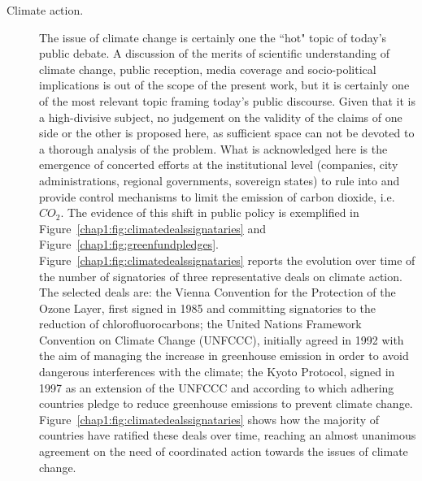 \begin{description}
\item[Climate action.] The issue of climate change is certainly one the ``hot" topic of today's public debate. A discussion of the merits of scientific understanding of climate change, public reception, media coverage and socio-political implications is out of the scope of the present work, but it is certainly one of the most relevant topic framing today's public discourse. Given that it is a high-divisive subject, no judgement on the validity of the claims of one side or the other is proposed here, as sufficient space can not be devoted to a thorough analysis of the problem. What is acknowledged here is the emergence of concerted efforts at the institutional level (companies, city administrations, regional governments, sovereign states) to rule into and provide control mechanisms to limit the emission of carbon dioxide, i.e. $CO_{2}$. The evidence of this shift in public policy is exemplified in Figure~\ref{chap1:fig:climatedealssignataries} and Figure~\ref{chap1:fig:greenfundpledges}.\\ Figure~\ref{chap1:fig:climatedealssignataries} reports the evolution over time of the number of signatories of three representative deals on climate action. The selected deals are: the Vienna Convention for the Protection of the Ozone Layer, first signed in 1985 and committing signatories to the reduction of chlorofluorocarbons; the United Nations Framework Convention on Climate Change (UNFCCC), initially agreed in 1992 with the aim of managing the increase in greenhouse emission in order to avoid dangerous interferences with the climate; the Kyoto Protocol, signed in 1997 as an extension of the UNFCCC and according to which adhering countries pledge to reduce greenhouse emissions to prevent climate change. Figure~\ref{chap1:fig:climatedealssignataries} shows how the majority of countries have ratified these deals over time, reaching an almost unanimous agreement on the need of coordinated action towards the issues of climate change.


\end{description}
